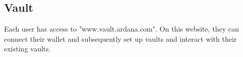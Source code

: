 \documentclass{article} %
\begin{document}
% 
% 
% 
% 
\subsection{Vault}

Each user has access to "www.vault.ardana.com". On this website, they can
connect their wallet and subsequently set up vaults and interact with their
existing vaults.
\end{document}
